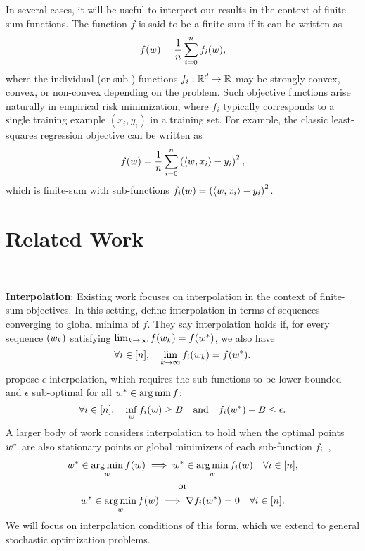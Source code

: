 In several cases, it will be useful to interpret our results in the context of finite-sum functions.
The function \( f \) is said to be a finite-sum if it can be written as 
\[ f(w) = \frac{1}{n} \sum_{i=0}^n f_i(w),  \]
where the individual (or sub-) functions \( f_i : \mathbb{R}^d \rightarrow \mathbb{R} \) may be strongly-convex, convex, or non-convex depending on the problem.
Such objective functions arise naturally in empirical risk minimization, where \( f_i \) typically corresponds to a single training example \( (x_i, y_i) \) in a training set.
For example, the classic least-squares regression objective can be written as 
\[ f(w) = \frac{1}{n} \sum_{i=0}^n \left(\left\langle w, x_i\right\rangle - y_i\right)^2, \] 
which is finite-sum with sub-functions \( f_i(w) =  \left(\left\langle w, x_i\right\rangle - y_i\right)^2 \).


\section{Related Work}~\label{sec:related-work}

\noindent \textbf{Interpolation}:
Existing work focuses on interpolation in the context of finite-sum objectives. 
In this setting, \citet{bassily2018exponential} define interpolation in terms of sequences converging to global minima of \( f \). 
They say interpolation holds if, for every sequence \( \left(w_k\right) \) satisfying \( \lim_{k \rightarrow \infty} f(w_k) = f(w^*) \), we also have 
\[ \forall i \in [n], \quad \lim_{k \rightarrow \infty} f_i(w_k) = f(w^*). \]
\citet{berrada2019training} propose \( \epsilon \)-interpolation, which requires the sub-functions to be lower-bounded and \( \epsilon \) sub-optimal for all \( w^* \in \mathop{\rm arg\,min} f \): 
\[ \forall i \in [n], \quad \inf_w f_i(w) \geq B \quad \text{and} \quad f_i(w^*) - B \leq \epsilon. \]
A larger body of work considers interpolation to hold when the optimal points \( w^* \) are also stationary points or global minimizers of each sub-function \( f_i \)~\citep{vaswani2019fast, vaswani2019painless, vaswani2020adaptive, meng2020fastandfurious, loizou2020sps},
\begin{gather*}
    w^* \in \mathop{\rm arg\,min}_{w} f(w) \implies w^* \in \mathop{\rm arg\,min}_{w} f_i(w) \quad \forall i \in [n],\\
          \text{or} \\
    w^* \in \mathop{\rm arg\,min}_{w} f(w) \implies \nabla f_i(w^*) = 0 \quad \forall i \in [n].
\end{gather*}
We will focus on interpolation conditions of this form, which we extend to general stochastic optimization problems.\\ 

